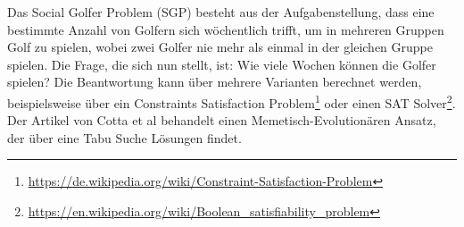 Das Social Golfer Problem (SGP) besteht aus der Aufgabenstellung, dass eine bestimmte Anzahl von Golfern sich wöchentlich trifft, um in mehreren Gruppen Golf zu spielen, wobei zwei Golfer nie mehr als einmal in der gleichen Gruppe spielen.
Die Frage, die sich nun stellt, ist: Wie viele Wochen können die Golfer spielen?
Die Beantwortung kann über mehrere Varianten berechnet werden, beispielsweise über ein Constraints Satisfaction Problem\footnote{\url{https://de.wikipedia.org/wiki/Constraint-Satisfaction-Problem}} oder einen SAT Solver\footnote{\url{https://en.wikipedia.org/wiki/Boolean_satisfiability_problem}}. Der Artikel von Cotta et al behandelt einen Memetisch-Evolutionären Ansatz, der über eine Tabu Suche Lösungen findet.
